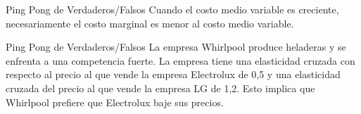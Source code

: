 \documentclass{beamer}
\begin{document}
\begin{frame}{Ping Pong de Verdaderos/Falsos}
    \centering
    Cuando el costo medio variable es creciente, necesariamente el costo marginal es menor al costo medio variable.
\end{frame}


\begin{frame}{Ping Pong de Verdaderos/Falsos}
    \centering
    La empresa Whirlpool produce heladeras y se enfrenta a una competencia fuerte. La empresa tiene una elasticidad cruzada con respecto al precio al que vende la empresa Electrolux de 0,5 y una elasticidad cruzada del precio al que vende la empresa LG de 1,2. Esto implica que Whirlpool prefiere que Electrolux baje sus precios.
\end{frame}
\end{document}
